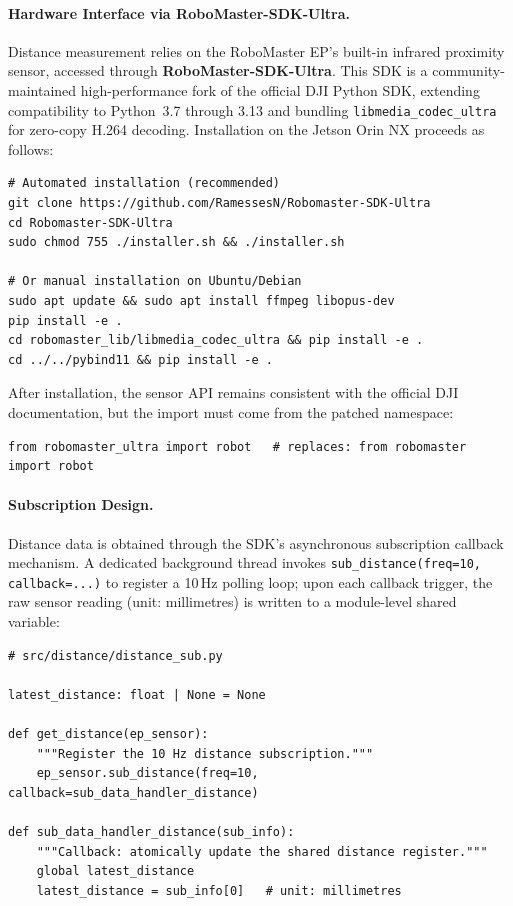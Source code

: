 \paragraph{Hardware Interface via RoboMaster-SDK-Ultra.}
Distance measurement relies on the RoboMaster EP's built-in infrared proximity sensor, accessed through
\textbf{RoboMaster-SDK-Ultra}. This SDK is a community-maintained high-performance fork of the official DJI Python SDK,
extending compatibility to Python~3.7 through 3.13 and bundling
\texttt{libmedia\_codec\_ultra} for zero-copy H.264 decoding.
Installation on the Jetson Orin NX proceeds as follows:

\begin{verbatim}
# Automated installation (recommended)
git clone https://github.com/RamessesN/Robomaster-SDK-Ultra
cd Robomaster-SDK-Ultra
sudo chmod 755 ./installer.sh && ./installer.sh

# Or manual installation on Ubuntu/Debian
sudo apt update && sudo apt install ffmpeg libopus-dev
pip install -e .
cd robomaster_lib/libmedia_codec_ultra && pip install -e .
cd ../../pybind11 && pip install -e .
\end{verbatim}

After installation, the sensor API remains consistent with the official DJI documentation, but the import must come from the patched namespace:

\begin{verbatim}
from robomaster_ultra import robot   # replaces: from robomaster import robot
\end{verbatim}

\paragraph{Subscription Design.}
Distance data is obtained through the SDK's asynchronous subscription callback mechanism. A dedicated background thread invokes
\texttt{sub\_distance(freq=10, callback=...)} to register a 10\,Hz polling loop;
upon each callback trigger, the raw sensor reading (unit: millimetres) is written to a module-level shared variable:

\begin{verbatim}
# src/distance/distance_sub.py

latest_distance: float | None = None

def get_distance(ep_sensor):
    """Register the 10 Hz distance subscription."""
    ep_sensor.sub_distance(freq=10, callback=sub_data_handler_distance)

def sub_data_handler_distance(sub_info):
    """Callback: atomically update the shared distance register."""
    global latest_distance
    latest_distance = sub_info[0]   # unit: millimetres
\end{verbatim}


